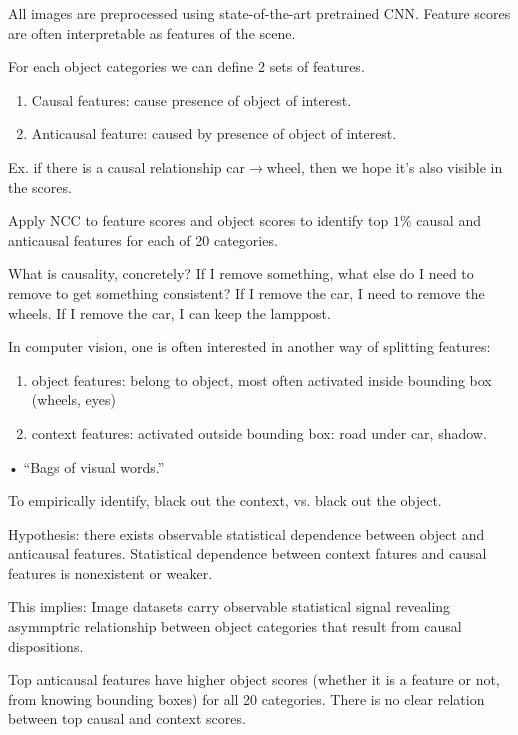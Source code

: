 All images are preprocessed using state-of-the-art pretrained CNN. Feature scores are often interpretable as features of the scene.

For each object categories we can define 2 sets of features.
\begin{enumerate}
\item
Causal features: cause presence of object of interest.
\item
Anticausal feature: caused by presence of object of interest.
\end{enumerate}
Ex. if there is a causal relationship car$\to$wheel, then we hope it's also visible in the scores.

Apply NCC to feature scores and object scores to %
identify top $1\%$ causal and anticausal features for each of 20 categories. 

What is causality, concretely?
If I remove something, what else do I need to remove to get something consistent? If I remove the car, I need to remove the wheels. If I remove the car, I can keep the lamppost.


In computer vision, one is often interested in another way of splitting features:
\begin{enumerate}
\item
object features: belong to object, most often activated inside bounding box (wheels, eyes)
\item
context features: activated outside bounding box: road under car, shadow.
\end{enumerate}•
``Bags of visual words.''

To empirically identify, black out the context, vs. black out the object.

Hypothesis: there exists observable statistical dependence between object and anticausal features. Statistical dependence between context fatures and causal features is nonexistent or weaker.

This implies: Image datasets carry observable statistical signal revealing asymmptric relationship between object categories that result from causal dispositions.


Top anticausal features have higher %
object scores (whether it is a feature or not, from  knowing bounding boxes) for all 20 categories. 
There is no clear relation between top causal and context scores.

